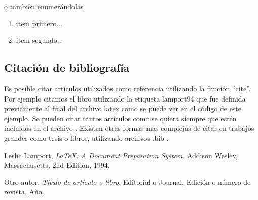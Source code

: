 \documentclass[a4paper,11pt]{article}
\begin{document}
o también enumerándolas

\begin{enumerate}
  \item item primero...
  \item item segundo...
\end{enumerate}


\subsection{Citación de bibliografía}
%
Es posible citar artículos utilizados como referencia utilizando la función ``cite''. Por ejemplo citamos el libro \cite{lamport94} utilizando la etiqueta lamport94 que fue definida previamente al final del archivo latex como se puede ver en el código de este ejemplo. %
%
Se pueden citar tantos artículos como se quiera siempre que estén incluidos en el archivo \cite{otraetiqueta}. Existen otras formas mas complejas de citar en trabajos grandes como tesis o libros, utilizando archivos .bib . %
%


\begin{thebibliography}{15}

  Leslie Lamport,
  \emph{\LaTeX: A Document Preparation System}.
  Addison Wesley, Massachusetts,
  2nd Edition,
  1994.

  Otro autor,
  \emph{Título de artículo o libro}.
  Editorial o Journal,
  Edición o número de revista,
  Año.

\end{thebibliography}

\end{document}

